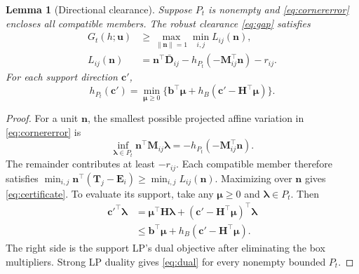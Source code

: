 \documentclass[journal]{IEEEtran}
\newtheorem{lemma}{Lemma}
\theoremstyle{definition}
\newcommand{\vct}[1]{\boldsymbol{#1}}
\newcommand{\mtx}[1]{\mathbf{#1}}
\begin{document}
\begin{lemma}[Directional clearance]\label{lem:directional}
Suppose $P_t$ is nonempty and \eqref{eq:cornererror} encloses all
compatible members. The robust clearance \eqref{eq:gap} satisfies
\begin{equation}\label{eq:certificate}
\begin{aligned}
 G_t(h;\vct u)&\ge\max_{\|\vct n\|=1}\min_{i,j} L_{ij}(\vct n),\\
 L_{ij}(\vct n)&=\vct n^\top\bar{\vct D}_{ij}
              -h_{P_t}(-\mtx M_{ij}^\top\vct n)-r_{ij}.
\end{aligned}
\end{equation}
For each support direction $\vct c'$,
\begin{equation}\label{eq:dual}
 h_{P_t}(\vct c')=
 \min_{\vct\mu\ge0}\{\vct b^\top\vct\mu+
                         h_B(\vct c'-\mtx H^\top\vct\mu)\}.
\end{equation}
\end{lemma}
\begin{proof}
For a unit $\vct n$, the smallest possible projected affine variation
in \eqref{eq:cornererror} is
\begin{equation*}
 \inf_{\vct\lambda\in P_t}\vct n^\top\mtx M_{ij}\vct\lambda
 =-h_{P_t}(-\mtx M_{ij}^\top\vct n).
\end{equation*}
The remainder contributes at least $-r_{ij}$. Each compatible member
therefore satisfies $\min_{i,j}\vct n^\top(\vct T_j-\vct E_i)
\ge\min_{i,j}L_{ij}(\vct n)$. Maximizing over $\vct n$ gives
\eqref{eq:certificate}. To evaluate its support, take any
$\vct\mu\ge0$ and $\vct\lambda\in P_t$. Then
\begin{equation*}
\begin{aligned}
 {\vct c'}^\top\vct\lambda
 &=\vct\mu^\top\mtx H\vct\lambda+
       (\vct c'-\mtx H^\top\vct\mu)^\top\vct\lambda\\
 &\le \vct b^\top\vct\mu+h_B(\vct c'-\mtx H^\top\vct\mu).
\end{aligned}
\end{equation*}
The right side is the support LP's dual objective after eliminating the
box multipliers. Strong LP duality gives \eqref{eq:dual} for every
nonempty bounded $P_t$.
\end{proof}
\end{document}
